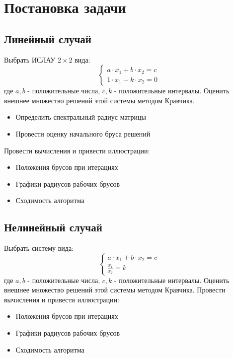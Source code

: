 \documentclass[a4paper,12pt]{article}
\begin{document}
    
    \newpage

    \tableofcontents
    \newpage

    \section{Постановка задачи}
    \subsection{Линейный случай}
    Выбрать ИСЛАУ $ 2 \times 2 $ вида:
    \begin{equation}
        \begin{cases}
            a \cdot x_{1} + b \cdot x_{2} = c \\
            1 \cdot x_{1} - k \cdot x_{2} = 0
        \end{cases}
        \label{eq:linear}
    \end{equation}
    где $ a, b $ - положительные числа, $ c, k $ - положительные интервалы.\newline
    Оценить внешнее множество решений этой системы методом Кравчика.
    \begin{itemize}
        \item Определить спектральный радиус матрицы
        \item Провести оценку начального бруса решений
    \end{itemize}
    Провести вычисления и привести иллюстрации:
    \begin{itemize}
        \item Положения брусов при итерациях
        \item Графики радиусов рабочих брусов
        \item Сходимость алгоритма
    \end{itemize}

    \subsection{Нелинейный случай}
    Выбрать систему вида:
    \begin{equation}
        \begin{cases}
            a \cdot x_{1} + b \cdot x_{2} = c \\
            \frac{x_{1}}{x_{2}} = k
        \end{cases}
        \label{eq:nonlinear}
    \end{equation}
    где $ a, b $ - положительные числа, $ c, k $ - положительные интервалы.\newline
    Оценить внешнее множество решений этой системы методом Кравчика.
    Провести вычисления и привести иллюстрации:
    \begin{itemize}
        \item Положения брусов при итерациях
        \item Графики радиусов рабочих брусов
        \item Сходимость алгоритма
    \end{itemize}
\end{document}
